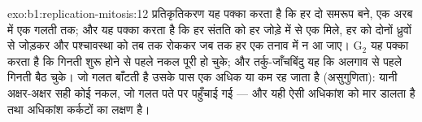 \begin{solution}{exo:b1:replication-mitosis:12}
प्रतिकृतिकरण यह पक्का करता है कि हर  दो समरूप  बने,
एक अरब में एक गलती तक; और  यह पक्का करता है कि हर संतति को हर जोड़े
में से एक मिले, हर  को दोनों ध्रुवों से जोड़कर और पश्चावस्था को
तब तक रोककर जब तक हर एक तनाव में न आ जाए। G$_2$  यह पक्का करता
है कि गिनती शुरू होने से पहले नकल पूरी हो चुके; और तर्कु-जाँचबिंदु यह कि
अलगाव से पहले गिनती बैठ चुके। जो  गलत बाँटती है उसके पास एक
 अधिक या कम रह जाता है (असुगुणिता): यानी अक्षर-अक्षर सही कोई नकल,
जो गलत पते पर पहुँचाई गई --- और यही ऐसी अधिकांश  को मार डालता है
तथा अधिकांश कर्कटों का लक्षण है।
\end{solution}

